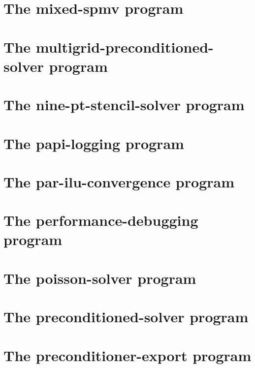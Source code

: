 \let\mypdfximage\pdfximage\def\pdfximage{\immediate\mypdfximage}\documentclass[twoside]{book}
\newcommand{\+}{\discretionary{\mbox{\scriptsize$\hookleftarrow$}}{}{}}
\begin{document}
\chapter{The mixed-\/spmv program}
\label{mixed_spmv}

\chapter{The multigrid-\/preconditioned-\/solver program}
\label{multigrid_preconditioned_solver}

\chapter{The nine-\/pt-\/stencil-\/solver program}
\label{nine_pt_stencil_solver}

\chapter{The papi-\/logging program}
\label{papi_logging}

\chapter{The par-\/ilu-\/convergence program}
\label{par_ilu_convergence}

\chapter{The performance-\/debugging program}
\label{performance_debugging}

\chapter{The poisson-\/solver program}
\label{poisson_solver}

\chapter{The preconditioned-\/solver program}
\label{preconditioned_solver}

\chapter{The preconditioner-\/export program}
\label{preconditioner_export}

\end{document}
